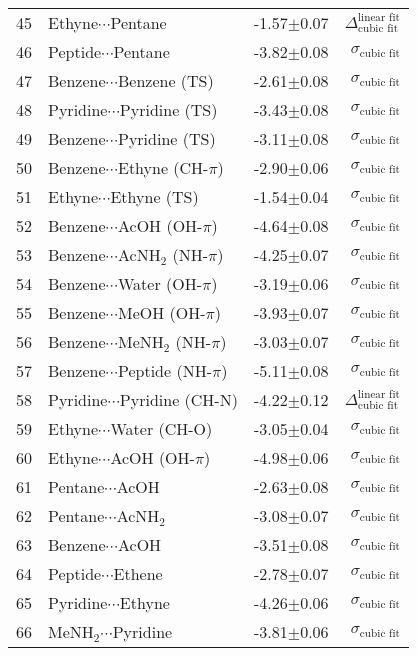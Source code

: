 \begin{longtable}{llrr}
45 & Ethyne$\cdots$Pentane & -1.57$\pm$0.07 & $\Delta_\text{cubic fit}^\text{linear fit}$ \\
46 & Peptide$\cdots$Pentane & -3.82$\pm$0.08 & $\sigma_\text{cubic fit}$ \\
47 & Benzene$\cdots$Benzene (TS) & -2.61$\pm$0.08 & $\sigma_\text{cubic fit}$ \\
48 & Pyridine$\cdots$Pyridine (TS) & -3.43$\pm$0.08 & $\sigma_\text{cubic fit}$ \\
49 & Benzene$\cdots$Pyridine (TS) & -3.11$\pm$0.08 & $\sigma_\text{cubic fit}$ \\
50 & Benzene$\cdots$Ethyne (CH-$\pi$) & -2.90$\pm$0.06 & $\sigma_\text{cubic fit}$ \\
51 & Ethyne$\cdots$Ethyne (TS) & -1.54$\pm$0.04 & $\sigma_\text{cubic fit}$ \\
52 & Benzene$\cdots$AcOH (OH-$\pi$) & -4.64$\pm$0.08 & $\sigma_\text{cubic fit}$ \\
53 & Benzene$\cdots$AcNH$_2$ (NH-$\pi$) & -4.25$\pm$0.07 & $\sigma_\text{cubic fit}$ \\
54 & Benzene$\cdots$Water (OH-$\pi$) & -3.19$\pm$0.06 & $\sigma_\text{cubic fit}$ \\
55 & Benzene$\cdots$MeOH (OH-$\pi$) & -3.93$\pm$0.07 & $\sigma_\text{cubic fit}$ \\
56 & Benzene$\cdots$MeNH$_2$ (NH-$\pi$) & -3.03$\pm$0.07 & $\sigma_\text{cubic fit}$ \\
57 & Benzene$\cdots$Peptide (NH-$\pi$) & -5.11$\pm$0.08 & $\sigma_\text{cubic fit}$ \\
58 & Pyridine$\cdots$Pyridine (CH-N) & -4.22$\pm$0.12 & $\Delta_\text{cubic fit}^\text{linear fit}$ \\
59 & Ethyne$\cdots$Water (CH-O) & -3.05$\pm$0.04 & $\sigma_\text{cubic fit}$ \\
60 & Ethyne$\cdots$AcOH (OH-$\pi$) & -4.98$\pm$0.06 & $\sigma_\text{cubic fit}$ \\
61 & Pentane$\cdots$AcOH & -2.63$\pm$0.08 & $\sigma_\text{cubic fit}$ \\
62 & Pentane$\cdots$AcNH$_2$ & -3.08$\pm$0.07 & $\sigma_\text{cubic fit}$ \\
63 & Benzene$\cdots$AcOH & -3.51$\pm$0.08 & $\sigma_\text{cubic fit}$ \\
64 & Peptide$\cdots$Ethene & -2.78$\pm$0.07 & $\sigma_\text{cubic fit}$ \\
65 & Pyridine$\cdots$Ethyne & -4.26$\pm$0.06 & $\sigma_\text{cubic fit}$ \\
66 & MeNH$_2$$\cdots$Pyridine & -3.81$\pm$0.06 & $\sigma_\text{cubic fit}$ \\
\end{longtable}